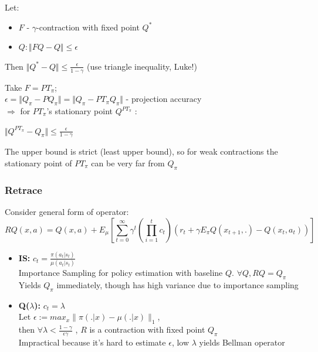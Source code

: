 \documentclass{beamer}
\begin{document}
\begin{frame}[t]
Let:
\begin{itemize}
\item $F$ - $\gamma$-contraction with fixed point $Q^*$\\
\item $Q: \Vert FQ - Q \Vert \leq \epsilon$
\end{itemize}
\vspace{3mm}
Then $\Vert Q^* - Q \Vert \leq \frac{\epsilon}{1-\gamma}$ (use triangle inequality, Luke!)

\vspace{4mm}

Take $F = PT_\pi$;\\
 $\epsilon = \Vert Q_\pi - PQ_\pi \Vert = \Vert Q_\pi - PT_\pi Q_\pi \Vert$ - projection accuracy\\
$\Rightarrow$ for $PT_\pi$'s stationary point $Q^{PT_\pi}$ :
\begin{center}
$\Vert Q^{PT_\pi} - Q_\pi \Vert \leq \frac{\epsilon}{1-\gamma}$
\end{center}

\vspace{4mm}

The upper bound is strict (least upper bound), so for weak contractions the stationary point of $PT_\pi$ can be very far from $Q_\pi$

\end{frame}


\begin{frame}[t]
\frametitle{Retrace}

Consider general form of operator:
\begin{equation*}
R Q (x,a) = Q(x,a) + E_\mu \left[ \sum_{t=0}^\infty \gamma^t \left( \prod_{i=1}^{t} c_t \right) \left( r_t + \gamma E_\pi Q (x_{t+1},.) - Q(x_t,a_t) \right) \right]
\end{equation*}

\begin{itemize}
\item \textbf{IS:} $c_t = \frac{\pi(a_t | s_t) }{\mu(a_t | s_t)}$ \\
Importance Sampling for policy estimation with baseline $Q$. $\forall Q,  R Q = Q_\pi$\\
Yields $Q_\pi$ immediately, though has high variance due to importance sampling

\item \textbf{Q($\lambda$):} $c_t = \lambda$ \\
Let $\epsilon := max_x \parallel \pi(.|x) - \mu(.|x) \parallel _1$, \\
then $\forall \lambda < \frac{1-\gamma}{\epsilon \gamma}$ , $R$ is a contraction 
with fixed point $Q_\pi$\\
Impractical because it's hard to estimate $\epsilon$, low $\lambda$ yields Bellman operator


\end{itemize}
\end{frame}
\end{document}
